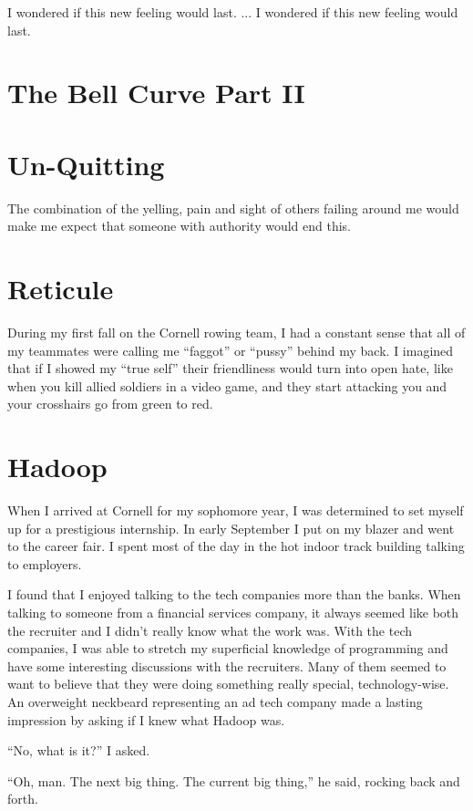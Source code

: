 \documentclass[12pt]{memoir}
\begin{document}
I wondered if this new feeling would last.
...
I wondered if this new feeling would last.

\chapter{The Bell Curve Part II}


\chapter{Un-Quitting}
The combination of the yelling, pain and sight of others failing around me would
make me expect that someone with authority would end this.


\chapter{Reticule}
During my first fall on the Cornell rowing team, I had a constant sense that
all of my teammates were calling me ``faggot'' or ``pussy'' behind my back.  I
imagined that if I showed my ``true self'' their friendliness would turn into
open hate, like when you kill allied soldiers in a video game, and they start
attacking you and your crosshairs go from green to red.  


\chapter{Hadoop}
When I arrived at Cornell for my sophomore year, I was determined to set myself
up for a prestigious internship.  In early September I put on my blazer and went
to the career fair.  I spent most of the day in the hot indoor track building
talking to employers. 

I found that I enjoyed talking to the tech companies more than the banks.  When
talking to someone from a financial services company, it always seemed like both
the recruiter and I didn't really know what the work was.  With the tech
companies, I was able to stretch my superficial knowledge of programming and
have some interesting discussions with the recruiters.  Many of them seemed to
want to believe that they were doing something really special, technology-wise.
An overweight neckbeard representing an ad tech company made a lasting impression 
by asking if I knew what Hadoop was.  

``No, what is it?'' I asked.

``Oh, man.  The next big thing.  The current big thing,'' he said,
rocking back and forth.
\end{document}
